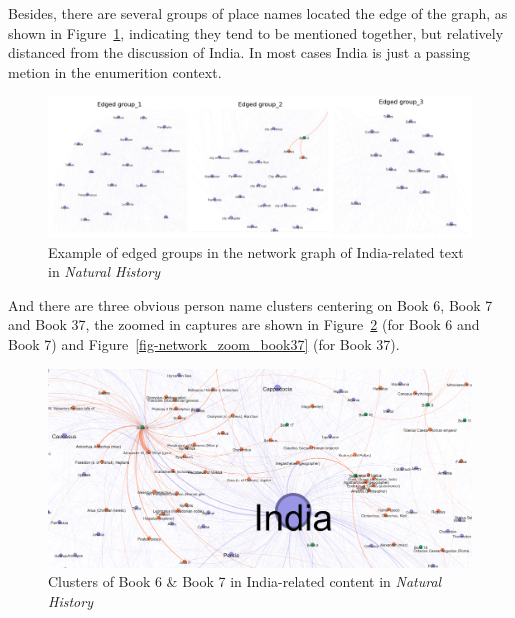 \documentclass[
  12pt,
]{article}
\begin{document}
Besides, there are several groups of place names located the edge of the
graph, as shown in Figure~\ref{fig-nw_edged_groups}, indicating they
tend to be mentioned together, but relatively distanced from the
discussion of India. In most cases India is just a passing metion in the
enumerition context.

\begin{figure}

{\centering \includegraphics{NHthesis_structure_files/figure-pdf/fig-nw_edged_groups-output-1.png}

}

\caption{\label{fig-nw_edged_groups}Example of edged groups in the
network graph of India-related text in \emph{Natural History}}

\end{figure}

And there are three obvious person name clusters centering on Book 6,
Book 7 and Book 37, the zoomed in captures are shown in
Figure~\ref{fig-network_zoom_book6n7} (for Book 6 and Book 7) and
Figure~\ref{fig-network_zoom_book37} (for Book 37).

\begin{figure}

{\centering \includegraphics{NHthesis_structure_files/figure-pdf/fig-network_zoom_book6n7-output-1.png}

}

\caption{\label{fig-network_zoom_book6n7}Clusters of Book 6 \& Book 7 in
India-related content in \emph{Natural History}}

\end{figure}
\end{document}
